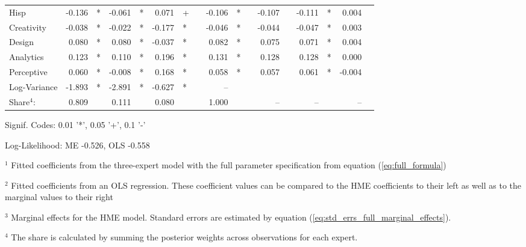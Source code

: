 \documentclass[12pt]{article}
\begin{document}
\begin{landscape}
\begin{table}
\begin{threeparttable}
\begin{tabular}[l]{l r l r l r l c r l c r l r l r l}
Hisp                  & -0.136 & *      & -0.061 & *      &  0.071 & +      && -0.106 & *     && -0.107 &          & -0.111 & *        &  0.004 &        \\
Creativity            & -0.038 & *      & -0.022 & *      & -0.177 & *      && -0.046 & *     && -0.044 &          & -0.047 & *        &  0.003 &        \\
Design                &  0.080 & *      &  0.080 & *      & -0.037 & *      &&  0.082 & *     &&  0.075 &          &  0.071 & *        &  0.004 &        \\
Analytics             &  0.123 & *      &  0.110 & *      &  0.196 & *      &&  0.131 & *     &&  0.128 &          &  0.128 & *        &  0.000 &        \\
Perceptive            &  0.060 & *      & -0.008 & *      &  0.168 & *      &&  0.058 & *     &&  0.057 &          &  0.061 & *        & -0.004 &        \\
Log-Variance          & -1.893 & *      & -2.891 & *      & -0.627 & *      &&  --    &       &&  &          &  &          &  &        \\
\cmidrule(l){2-3} \cmidrule(l){4-5} \cmidrule(l){6-7} \cmidrule(l){9-10} \cmidrule(l){12-13} \cmidrule(l){14-15} \cmidrule(l){16-17}
Share$^{4}$:          & 0.809  &        & 0.111  &      & 0.080 &           &&  1.000 &       &&  --    &          &  --    &          &  --    &        \\
\cmidrule{1-17}
      \end{tabular}

      \begin{tablenotes}
        \item Signif. Codes: 0.01 '*', 0.05 '+', 0.1 '-'
        \item Log-Likelihood: ME -0.526, OLS -0.558
        \item $^{1}$ Fitted coefficients from the three-expert model with the full parameter specification from equation (\ref{eq:full_formula})
        \item $^{2}$ Fitted coefficients from an OLS regression. These coefficient values can be compared to the HME coefficients to their left as well as to the marginal values to their right
        \item $^{3}$ Marginal effects for the HME model. Standard errors are estimated by equation (\ref{eq:std_errs_full_marginal_effects}).
        \item $^{4}$ The share is calculated by summing the posterior weights across observations for each expert.

      \end{tablenotes} \label{tbl:3W_full_regressions_results}


    \end{threeparttable}

\end{table}
\end{landscape}
\end{document}
